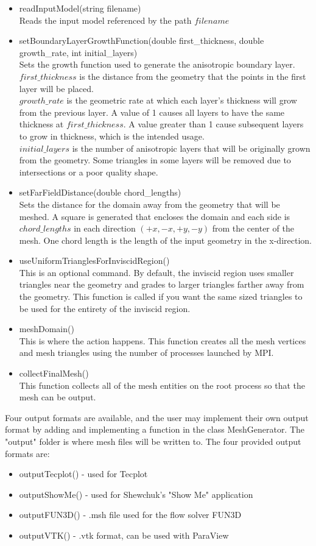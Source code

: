 \documentclass[manuscript, screen]{acmart}
\begin{document}
\begin{itemize}
\item readInputModel(string filename)\\
Reads the input model referenced by the path $filename$
\item setBoundaryLayerGrowthFunction(double first\_thickness, double growth\_rate, int initial\_layers)\\
Sets the growth function used to generate the anisotropic boundary layer.\\
$first\_thickness$ is the distance from the geometry that the points in the first layer will be placed.\\
$growth\_rate$ is the geometric rate at which each layer's thickness will grow from the previous layer. A value of 1 causes all layers to have the same thickness at $first\_thickness$. A value greater than 1 cause subsequent layers to grow in thickness, which is the intended usage.\\ 
$initial\_layers$ is the number of anisotropic layers that will be originally grown from the geometry. Some triangles in some layers will be removed due to intersections or a poor quality shape. 
\item setFarFieldDistance(double chord\_lengths)\\
Sets the distance for the domain away from the geometry that will be meshed. A square is generated that encloses the domain and each side is $chord\_lengths$ in each direction $(+x, -x, +y, -y)$ from the center of the mesh. One chord length is the length of the input geometry in the x-direction. 
\item useUniformTrianglesForInviscidRegion()\\
This is an optional command. By default, the inviscid region uses smaller triangles near the geometry and grades to larger triangles farther away from the geometry. This function is called if you want the same sized triangles to be used for the entirety of the inviscid region.
\item meshDomain()\\
This is where the action happens. This function creates all the mesh vertices and mesh triangles using the number of processes launched by MPI.
\item collectFinalMesh()\\
This function collects all of the mesh entities on the root process so that the mesh can be output.
\end{itemize}

Four output formats are available, and the user may implement their own output format by adding and implementing a function in the class MeshGenerator. The "output" folder is where mesh files will be written to. The four provided output formats are:
\begin{itemize}
\item outputTecplot() - used for Tecplot
\item outputShowMe() - used for Shewchuk's "Show Me" application
\item outputFUN3D() - .msh file used for the flow solver FUN3D
\item outputVTK() - .vtk format, can be used with ParaView
\end{itemize}
\end{document}
